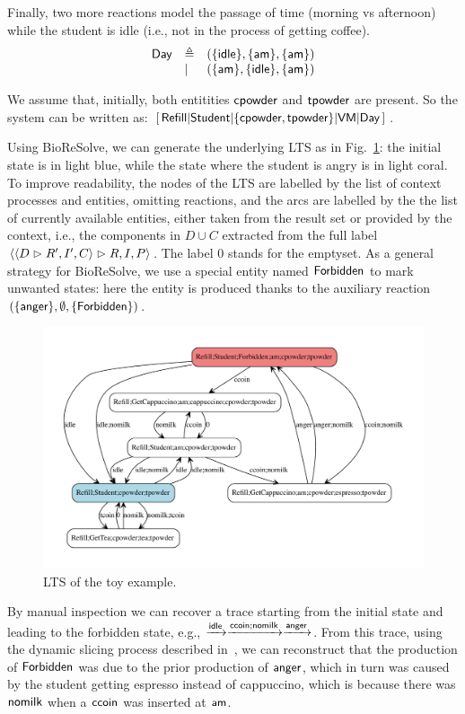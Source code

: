 Finally, two more reactions model the passage of time (morning vs afternoon) while the student is idle (i.e., not in the process of getting coffee).
\[
\begin{array}{lll}
\mathsf{Day} & \triangleq & (\{{\text{\sffamily idle}}\},\{{\text{\sffamily am}}\},\{{\text{\sffamily am}}\})\\
& | & (\{{\text{\sffamily am}}\},\{{\text{\sffamily idle}}\},\{{\text{\sffamily am}}\})
\end{array}
\]

We assume that, initially, both entitities ${\text{\sffamily cpowder}}$ and ${\text{\sffamily tpowder}}$ are present.
So the system can be written as:
\(
[\,\mathsf{Refill}
| \mathsf{Student}
| \{{\text{\sffamily cpowder}},{\text{\sffamily tpowder}}\} 
| \mathsf{VM}
| \mathsf{Day}\,]
\).

Using BioReSolve, we can generate the underlying LTS as in Fig.~\ref{fig:toylts}: the initial state is in light blue, while the state where the student is angry is in light coral.
To improve readability, the nodes of the LTS are labelled by the list of context processes and entities, omitting reactions, and the arcs are labelled by the the list of currently available entities, either taken from the result set or provided by the context, i.e., the components in $D\cup C$ extracted from the full label $\langle \langle D\vartriangleright R',I',C\rangle\vartriangleright R,I,P\rangle$. The label $0$ stands for the emptyset.
As a general strategy for BioReSolve, we use a special entity named ${\text{\sffamily Forbidden}}$ to mark unwanted states: here the entity is produced thanks to the auxiliary reaction $(\{{\text{\sffamily anger}}\},\emptyset,\{{\text{\sffamily Forbidden}}\})$.

\begin{figure}
\includegraphics[scale=.3]{./figs/toylts}
\caption{LTS of the toy example.\label{fig:toylts}}
\end{figure}

By manual inspection we can recover a trace starting from the initial state and leading to the forbidden state, e.g., $\xrightarrow{{\text{\sffamily idle}}}\xrightarrow{{\text{\sffamily ccoin}};{\text{\sffamily nomilk}}}\xrightarrow{{\text{\sffamily anger}}}$. From this trace, using the dynamic slicing process described in~\cite{DBLP:journals/nc/BrodoBF24}, we can reconstruct that the production of ${\text{\sffamily Forbidden}}$ was due to the prior production of ${\text{\sffamily anger}}$, which in turn was caused by the student getting espresso instead of cappuccino, which is because there was ${\text{\sffamily nomilk}}$ when a ${\text{\sffamily ccoin}}$ was inserted at ${\text{\sffamily am}}$. 
